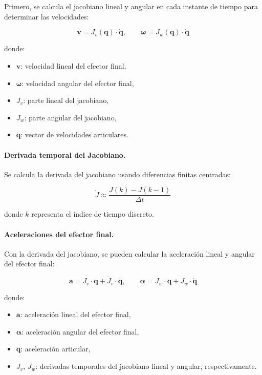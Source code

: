 Primero, se calcula el jacobiano lineal y angular en cada instante de tiempo para determinar las velocidades:

\begin{equation}
	\mathbf{v} = J_v(\mathbf{q}) \cdot \dot{\mathbf{q}}, \qquad
	\boldsymbol{\omega} = J_w(\mathbf{q}) \cdot \dot{\mathbf{q}}
\end{equation}

donde:
\begin{itemize}
	\item $\mathbf{v}$: velocidad lineal del efector final,
	\item $\boldsymbol{\omega}$: velocidad angular del efector final,
	\item $J_v$: parte lineal del jacobiano,
	\item $J_w$: parte angular del jacobiano,
	\item $\dot{\mathbf{q}}$: vector de velocidades articulares.
\end{itemize}

\vspace{0.5em}
\paragraph{Derivada temporal del Jacobiano.}

Se calcula la derivada del jacobiano usando diferencias finitas centradas:

\begin{equation}
	\dot{J} \approx \frac{J(k) - J(k-1)}{\Delta t}
\end{equation}

donde $k$ representa el índice de tiempo discreto.

\vspace{0.5em}
\paragraph{Aceleraciones del efector final.}

Con la derivada del jacobiano, se pueden calcular la aceleración lineal y angular del efector final:

\begin{equation}
	\mathbf{a} = J_v \cdot \ddot{\mathbf{q}} + \dot{J}_v \cdot \dot{\mathbf{q}}, \qquad
	\boldsymbol{\alpha} = J_w \cdot \ddot{\mathbf{q}} + \dot{J}_w \cdot \dot{\mathbf{q}}
\end{equation}

donde:
\begin{itemize}
	\item $\mathbf{a}$: aceleración lineal del efector final,
	\item $\boldsymbol{\alpha}$: aceleración angular del efector final,
	\item $\ddot{\mathbf{q}}$: aceleración articular,
	\item $\dot{J}_v$, $\dot{J}_w$: derivadas temporales del jacobiano lineal y angular, respectivamente.
\end{itemize}

